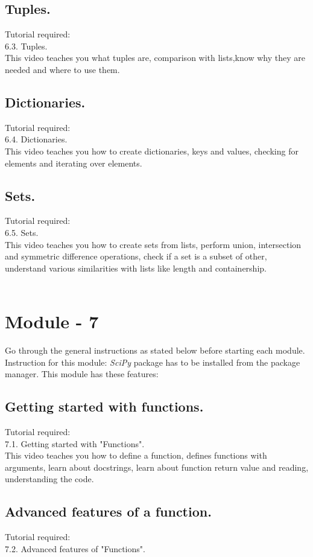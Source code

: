 \documentclass[11pt,twocolumn]{article}
\begin{document}
\subsection{Tuples.}
Tutorial required: \\ 6.3. Tuples. \\

This video teaches you what tuples are, comparison with lists,know why they are needed and where to use them. 
\subsection{Dictionaries.}
Tutorial required: \\ 6.4. Dictionaries. \\

This video teaches you how to create dictionaries, keys and values, checking for elements and iterating over elements. 
\subsection{Sets.}
Tutorial required: \\ 6.5. Sets. \\

This video teaches you how to create sets from lists, perform union, intersection and symmetric difference operations, check if a set is a subset of other, understand various similarities with lists like length and containership.\\ \\


\section{Module - 7}
Go through the general instructions as stated below before starting each module.
Instruction for this module: \emph{SciPy} package has to be installed from the package manager. 
This module has these features:
\subsection{Getting started with functions.}
Tutorial required: \\ 7.1. Getting started with "Functions". \\
This video teaches you how to define a function, defines functions with arguments, learn about docstrings, learn about function return value and reading, understanding the code.
\subsection{Advanced features of a function.}
Tutorial required: \\ 7.2. Advanced features of "Functions". \\
\end{document}
